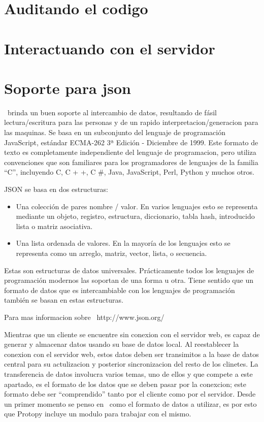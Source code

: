 \section{Auditando el codigo}

\section{Interactuando con el servidor}

\section{Soporte para json}
\JSON\ brinda un buen soporte al intercambio de datos, resultando de fásil
lectura/escritura para las personas y de un rapido interpretacion/generacion
para las maquinas. Se basa en un subconjunto del lenguaje de programación
JavaScript, estándar ECMA-262 3ª Edición - Diciembre de 1999. Este formato de
texto es completamente independiente del lenguaje de programacion, pero utiliza
convenciones que son familiares para los programadores de lenguajes de la
familia ``C'', incluyendo C, C + +, C \#, Java, JavaScript, Perl, Python y muchos otros.

JSON se basa en dos estructuras:
\begin{itemize}
  \item Una colección de pares nombre / valor. En varios lenguajes esto se
  representa mediante un objeto, registro, estructura, diccionario, tabla hash,
  introducido lista o matriz asociativa.
  \item Una lista ordenada de valores. En la mayoría de los lenguajes esto se
  representa como un arreglo, matriz, vector, lista, o secuencia.
\end{itemize}

Estas son estructuras de datos universales. Prácticamente todos los lenguajes
de programación modernos las soportan de una forma u otra. Tiene sentido que un
formato de datos que es intercambiable con los lenguajes de programación
también se basan en estas estructuras.

Para mas informacion sobre \JSON\ http://www.json.org/

Mientras que un cliente se encuentre sin conexion con el servidor web, es capaz
de generar y almacenar datos usando su base de datos local. Al reestablecer
la conexion con el servidor web, estos datos deben ser transimitos a la base de
datos central para su actulizacion y posterior sincronizacion del resto de los
clinetes.
La transferencia de datos involucra varios temas, uno de ellos y que compete
a este apartado, es el formato de los datos que se deben pasar por
la conexcion; este formato debe ser ``comprendido'' tanto por el cliente como
por el servidor. Desde un primer momento se penso en \JSON\ como el formato
de datos a utilizar, es por esto que Protopy incluye un modulo para trabajar con el mismo.

